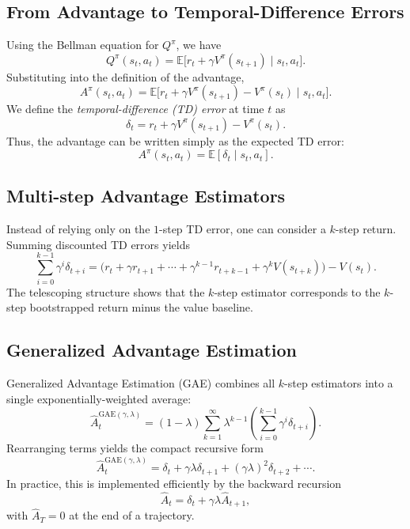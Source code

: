 \subsection{From Advantage to Temporal-Difference Errors}
Using the Bellman equation for $Q^\pi$, we have
\begin{equation}
    Q^\pi(s_t,a_t) = \mathbb{E}\big[r_t + \gamma V^\pi(s_{t+1}) \mid s_t, a_t\big].
\end{equation}
Substituting into the definition of the advantage,
\begin{equation}
    A^\pi(s_t,a_t) = \mathbb{E}\big[r_t + \gamma V^\pi(s_{t+1}) - V^\pi(s_t) \mid s_t,a_t\big].
\end{equation}
We define the \emph{temporal-difference (TD) error} at time $t$ as
\begin{equation}
    \delta_t = r_t + \gamma V^\pi(s_{t+1}) - V^\pi(s_t).
\end{equation}
Thus, the advantage can be written simply as the expected TD error:
\begin{equation}
    A^\pi(s_t,a_t) = \mathbb{E}[\delta_t \mid s_t,a_t].
\end{equation}

\subsection{Multi-step Advantage Estimators}
Instead of relying only on the $1$-step TD error, one can consider a $k$-step return. Summing discounted TD errors yields
\begin{equation}
    \sum_{i=0}^{k-1} \gamma^i \delta_{t+i} 
    = \Big( r_t + \gamma r_{t+1} + \cdots + \gamma^{k-1} r_{t+k-1} + \gamma^k V(s_{t+k}) \Big) - V(s_t).
\end{equation}
The telescoping structure shows that the $k$-step estimator corresponds to the $k$-step bootstrapped return minus the value baseline.

\subsection{Generalized Advantage Estimation}
Generalized Advantage Estimation (GAE) \cite{schulman2015high} combines all $k$-step estimators into a single exponentially-weighted average:
\begin{equation}
    \hat{A}_t^{\text{GAE}(\gamma,\lambda)} = (1-\lambda)\sum_{k=1}^\infty \lambda^{k-1}
    \left( \sum_{i=0}^{k-1} \gamma^i \delta_{t+i} \right).
\end{equation}
Rearranging terms yields the compact recursive form
\begin{equation}
    \hat{A}_t^{\text{GAE}(\gamma,\lambda)} = \delta_t + \gamma\lambda \delta_{t+1} + (\gamma\lambda)^2 \delta_{t+2} + \cdots.
\end{equation}
In practice, this is implemented efficiently by the backward recursion
\begin{equation}
    \hat{A}_t = \delta_t + \gamma\lambda \hat{A}_{t+1},
\end{equation}
with $\hat{A}_T = 0$ at the end of a trajectory.

